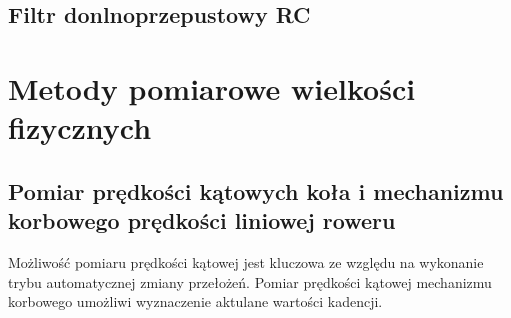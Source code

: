 \subsection{Filtr donlnoprzepustowy RC}
\label{filtrRc}
\section{Metody pomiarowe wielkości fizycznych}
\subsection{Pomiar prędkości kątowych koła i mechanizmu korbowego prędkości liniowej roweru}

Możliwość pomiaru prędkości kątowej jest kluczowa ze względu na wykonanie trybu automatycznej zmiany przełożeń. Pomiar prędkości kątowej mechanizmu korbowego umożliwi wyznaczenie aktulane wartości kadencji.

